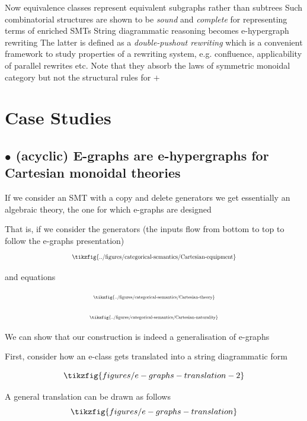 \documentclass[aspectratio=169]{beamer}
\newcommand{\bsubsection}[1]{\subsection{$\bullet$ #1}}
\begin{document}
\begin{frame}{}
    \vfill
    Now equivalence classes represent equivalent subgraphs rather than subtrees
    \pause
    \vfill
    \pause
    Such combinatorial structures are shown to be \textit{sound} and \textit{complete} for representing terms of enriched SMTs
    \vfill
    \pause
    String diagrammatic reasoning becomes e-hypergraph rewriting
    \vfill
    \pause
    The latter is defined as a \textit{double-pushout rewriting} which is a convenient framework to study properties of a rewriting system, e.g. confluence, applicability of parallel rewrites etc.
    \vfill
    \pause
    Note that they absorb the laws of symmetric monoidal category but not the structural rules for $+$
\end{frame}

\section{Case Studies}

\bsubsection{(acyclic) E-graphs are e-hypergraphs for Cartesian monoidal theories}

\begin{frame}{}
    If we consider an SMT with a copy and delete generators we get essentially an algebraic theory, the one for which e-graphs are designed

    That is, if we consider the generators (the inputs flow from bottom to top to follow the e-graphs presentation)
    \[
	\scalebox{0.7}{
  	 \tikzfig{../figures/categorical-semantics/Cartesian-equipment}
	}
    \]

    and equations

    \begin{minipage}{0.4\linewidth}
        \[
            \scalebox{0.55}{
            \tikzfig{../figures/categorical-semantics/Cartesian-theory}	
            }
            \]
    \end{minipage}
    \hfill
    \begin{minipage}{0.5\linewidth}
        \[
            \scalebox{0.55}{
            \tikzfig{../figures/categorical-semantics/Cartesian-naturality}
            }
        \]
    \end{minipage}


    We can show that our construction is indeed a generalisation of e-graphs
\end{frame}

\begin{frame}{}
    First, consider how an e-class gets translated into a string diagrammatic form

    \begin{example}
    \[
    \tikzfig{figures/e-graphs-translation-2}
    \]
    \end{example}

    A general translation can be drawn as follows
    \[
    \tikzfig{figures/e-graphs-translation}
    \]
\end{frame}
\end{document}
